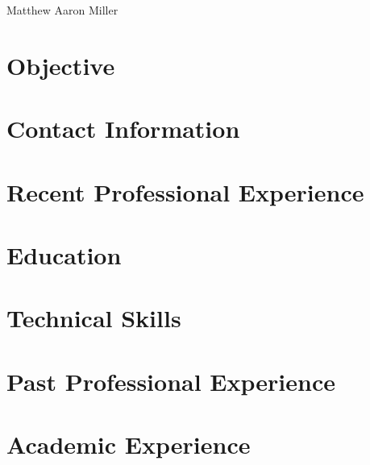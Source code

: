 \documentclass[10pt]{article}
\begin{document}
Matthew Aaron Miller

\begin{minipage}{0.48\linewidth}
 \section{Objective}
 \myobjective
\end{minipage}    

\begin{minipage}{0.48\linewidth}
 \section{Contact Information}
 \mycontact
\end{minipage}

\section{Recent Professional Experience}
\myrecentprojobs

\section{Education}
\myeducation

\section{Technical Skills}
\mytechs

\section{Past Professional Experience}
\mypastprojobs

\section{Academic Experience}
\myteaching
\end{document}
